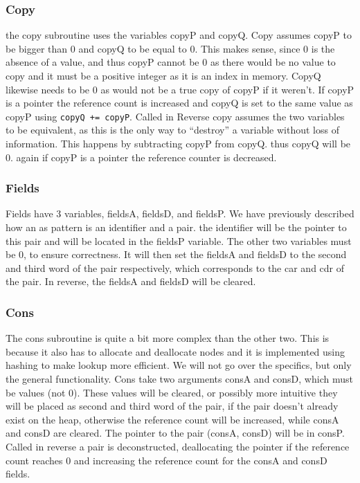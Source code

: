 \documentclass[a4paper]{article}
\begin{document}
\subsubsection{Copy}
\label{sec:org32080fb}
the copy subroutine uses the variables copyP and copyQ. Copy assumes copyP to be bigger than 0 and copyQ to be equal to 0. This makes sense, since 0 is the absence of a value, and thus copyP cannot be 0 as there would be no value to copy and it must be a positive integer as it is an index in memory. CopyQ likewise needs to be 0 as would not be a true copy of copyP if it weren't. If copyP is a pointer the reference count is increased and copyQ is set to the same value as copyP using \texttt{copyQ += copyP}. Called in Reverse copy assumes the two variables to be equivalent, as this is the only way to ``destroy'' a variable without loss of information. This happens by subtracting copyP from copyQ. thus copyQ will be 0. again if copyP is a pointer the reference counter is decreased.
\subsubsection{Fields}
\label{sec:org0101e74}
Fields have 3 variables, fieldsA, fieldsD, and fieldsP. We have previously described how an as pattern is an identifier and a pair. the identifier will be the pointer to this pair and will be located in the fieldsP variable. The other two variables must be 0, to ensure correctness. It will then set the fieldsA and fieldsD to the second and third word of the pair respectively, which corresponds to the car and cdr of the pair. In reverse, the fieldsA and fieldsD will be cleared.
\subsubsection{Cons}
\label{sec:org0ecb2e8}
The cons subroutine is quite a bit more complex than the other two. This is because it also has to allocate and deallocate nodes and it is implemented using hashing to make lookup more efficient. We will not go over the specifics, but only the general functionality. Cons take two arguments consA and consD, which must be values (not 0). These values will be cleared, or possibly more intuitive they will be placed as second and third word of the pair, if the pair doesn't already exist on the heap, otherwise the reference count will be increased, while consA and consD are cleared. The pointer to the pair (consA, consD) will be in consP. Called in reverse a pair is deconstructed, deallocating the pointer if the reference count reaches 0 and increasing the reference count for the consA and consD fields.
\end{document}
